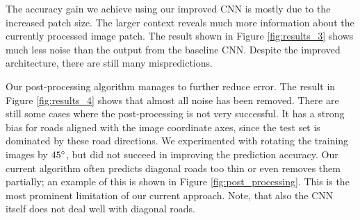 \documentclass[10pt,conference,compsocconf]{IEEEtran}
\begin{document}
\par 
The accuracy gain we achieve using our improved CNN is mostly due to the increased patch size. The larger context reveals much more information about the currently processed image patch. The result shown in Figure \ref{fig:results_3} shows much less noise than the output from the baseline CNN. Despite the improved architecture, there are still many mispredictions. 

\par
Our post-processing algorithm manages to further reduce error. The result in Figure \ref{fig:results_4} shows that almost all noise has been removed. There are still some cases where the post-processing is not very successful. It has a strong bias for roads aligned with the image coordinate axes, since the test set is dominated by these road directions. We experimented with rotating the training images by $ 45\degree $, but did not succeed in improving the prediction accuracy. Our current algorithm often predicts diagonal roads too thin or even removes them partially; an example of this is shown in Figure \ref{fig:post_processing}. This is the most prominent limitation of our current approach. Note, that also the CNN itself does not deal well with diagonal roads.
\end{document}
